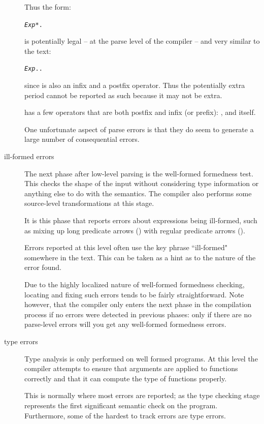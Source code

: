 \begin{description}
\begin{aside}
Thus the form:
\begin{alltt}
\emph{Exp} *.
\end{alltt}
is potentially legal -- at the parse level of the compiler -- and very similar to the text:
\begin{alltt}
\emph{Exp} . .
\end{alltt}
since \dotspace is also an infix and a postfix operator. Thus the potentially extra period cannot be reported as such because it may not be extra.

\go has a few operators that are both postfix and infix (or prefix): \q{;}, \q{*} and \q{\dotspace} itself.
\end{aside}
One unfortunate aspect of parse errors is that they do seem to generate a large number of consequential errors.

\item[ill-formed errors]
The next phase after low-level parsing is the well-formed formedness test. This checks the shape of the input without considering type information or anything else to do with the semantics. The compiler also performs some source-level transformations at this stage.

It is this phase that reports errors about expressions being ill-formed, such as mixing up long predicate arrows (\q{:--}) with regular predicate arrows (\q{:-}).

Errors reported at this level often use the key phrase ``ill-formed" somewhere in the text. This can be taken as a hint as to the nature of the error found.

Due to the highly localized nature of well-formed formedness checking, locating and fixing such errors tends to be fairly straightforward. Note however, that the compiler only enters the next phase in the compilation process if no errors were detected in previous phases: only if there are no parse-level errors will you get any well-formed formedness errors.

\item[type errors]
Type analysis is only performed on well formed programs. At this level the compiler attempts to ensure that arguments are applied to functions correctly and that it can compute the type of functions properly.

This is normally where most errors are reported; as the type checking stage represents the first significant semantic check on the program. Furthermore, some of the hardest to track errors are type errors.


\end{description}
